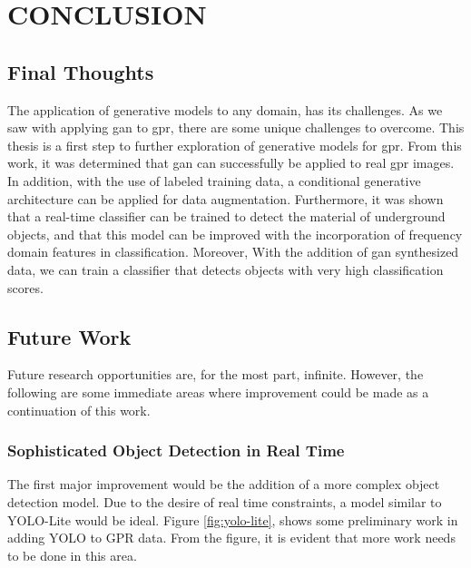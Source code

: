 \chapter{CONCLUSION}

\section{Final Thoughts}
\hspace{0.5in}The application of generative models to any domain, has its challenges. As we saw with applying \acrshort{gan} to \acrshort{gpr}, there are some unique challenges to overcome. This thesis is a first step to further exploration of generative models for \acrshort{gpr}. From this work, it was determined that \acrshort{gan} can successfully be applied to real \acrshort{gpr} images. In addition, with the use of labeled training data, a conditional generative architecture can be applied for data augmentation. Furthermore, it was shown that a real-time classifier can be trained to detect the material of underground objects, and that this model can be improved with the incorporation of frequency domain features in classification. Moreover, With the addition of \acrshort{gan} synthesized data, we can train a classifier that detects objects with very high classification scores.

\section{Future Work}
\hspace{0.5in}Future research opportunities are, for the most part, infinite. However, the following are some immediate areas where improvement could be made as a continuation of this work.

\subsection{Sophisticated Object Detection in Real Time}
\hspace{0.5in}The first major improvement would be the addition of a more complex object detection model. Due to the desire of real time constraints, a model similar to YOLO-Lite \cite{yolo-lite} would be ideal. Figure \ref{fig:yolo-lite}, shows some preliminary work in adding YOLO to GPR data. From the figure, it is evident that more work needs to be done in this area. 
\vspace{0.5\baselineskip}

